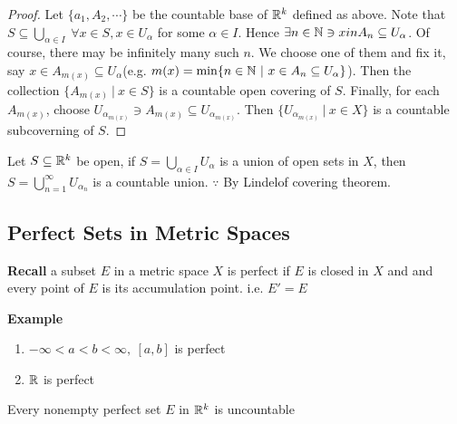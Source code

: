 \begin{proof}
	Let $\{a_1,A_2,\cdots\}$ be the countable base of $\mathbb{R}^k$ defined as above. Note that $S \subseteq \bigcup_{\alpha \in I}~\forall x \in S,x \in U_{\alpha}$ for some $\alpha \in I$. Hence $\exists n \in \mathbb{N} \ni x in A_n \subseteq U_\alpha$. Of course, there may be infinitely many such $n$. We choose one of them and fix it, say $x \in A_{m(x)} \subseteq U_{\alpha}$(e.g. $m(x) = \min \{ n \in \mathbb{N} ~|~ x \in A_n \subseteq U_\alpha\}$). Then the collection $\{A_{m(x)}~|~x \in S\}$ is a countable open covering of $S$. Finally, for each $A_{m(x)}$, choose $U_{\alpha_{m(x)}} \ni A_{m(x)} \subseteq U_{\alpha_{m(x)}}$. Then $\{U_{\alpha_{m(x)}}~|~ x \in X\}$ is a countable subcoverning of $S$.
\end{proof}

\begin{cor}
	Let $S \subseteq \mathbb{R}^k$ be open, if $S = \bigcup_{\alpha \in I}U_\alpha $ is a union of open sets in $X$, then $S = \bigcup^{\infty}_{n = 1}U_{\alpha_n}$ is a countable union. $\because$ By Lindelof covering theorem.	
\end{cor}

\subsection{Perfect Sets in Metric Spaces}

\textbf{Recall}
a subset $E$ in a metric space $X$ is perfect if $E$ is closed in $X$ and and every point of $E$ is its accumulation point. i.e. $E' = E$

\textbf{Example}
\begin{enumerate}[wide,label=$\bullet$]
	\item $-\infty < a < b < \infty,~ [a,b]$ is perfect
	\item $\mathbb{R}$ is perfect
\end{enumerate}

\begin{thm}
	Every nonempty perfect set $E$ in $\mathbb{R}^k$ is uncountable
\end{thm}

